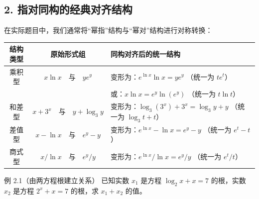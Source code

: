 \documentclass[11pt,a4paper]{ctexart}
\begin{document}
\subsection{2. 指对同构的经典对齐结构}
在实际题目中，我们通常将“幂指”结构与“幂对”结构进行对称转换：
\begin{center}
\renewcommand{\arraystretch}{1.3}
\begin{tabularx}{0.95\linewidth}{c c X}
\toprule
结构类型 & 原始形式组 & 同构对齐后的统一结构 \\
\midrule
乘积型 & $x \ln x \quad \text{与} \quad y e^y$ & 变形为：$e^{\ln x}\ln x = y e^y$ （统一为 $t e^t$） \\
 & & 或：$x \ln x = e^y \ln(e^y)$ （统一为 $t \ln t$） \\
\midrule
和差型 & $x + 3^x \quad \text{与} \quad y + \log_3 y$ & 变形为：$\log_3(3^x) + 3^x = \log_3 y + y$ （统一为 $\log_3 t + t$） \\
\midrule
差值型 & $x - \ln x \quad \text{与} \quad e^y - y$ & 变形为：$e^{\ln x} - \ln x = e^y - y$ （统一为 $e^t - t$） \\
\midrule
商式型 & $x / \ln x \quad \text{与} \quad e^y / y$ & 变形为：$e^{\ln x} / \ln x = e^y / y$ （统一为 $e^t / t$） \\
\bottomrule
\end{tabularx}
\end{center}

\newpage

\begin{exbox}{例 2.1（由两方程根建立关系）}
已知实数 $x_1$ 是方程 $\log_2 x + x = 7$ 的根，实数 $x_2$ 是方程 $2^x + x = 7$ 的根，求 $x_1 + x_2$ 的值。
\end{exbox}
\end{document}

